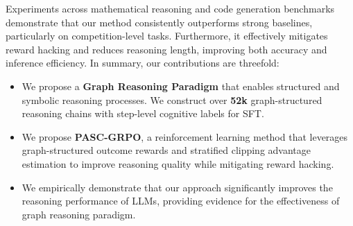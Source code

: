 
Experiments across mathematical reasoning and code generation benchmarks demonstrate that our method consistently outperforms strong baselines, particularly on competition-level tasks. Furthermore, it effectively mitigates reward hacking and reduces reasoning length, improving both accuracy and inference efficiency. In summary, our contributions are threefold:
\begin{itemize}
    \item We propose a \textbf{Graph Reasoning Paradigm} that enables structured and symbolic reasoning processes. We construct over \textbf{52k} graph-structured reasoning chains with step-level cognitive labels for SFT.
    \item We propose \textbf{PASC-GRPO}, a reinforcement learning method that leverages graph-structured outcome rewards and stratified clipping advantage estimation to improve reasoning quality while mitigating reward hacking.
    \item We empirically demonstrate that our approach significantly improves the reasoning performance of LLMs, providing evidence for the effectiveness of graph reasoning paradigm.
\end{itemize}




